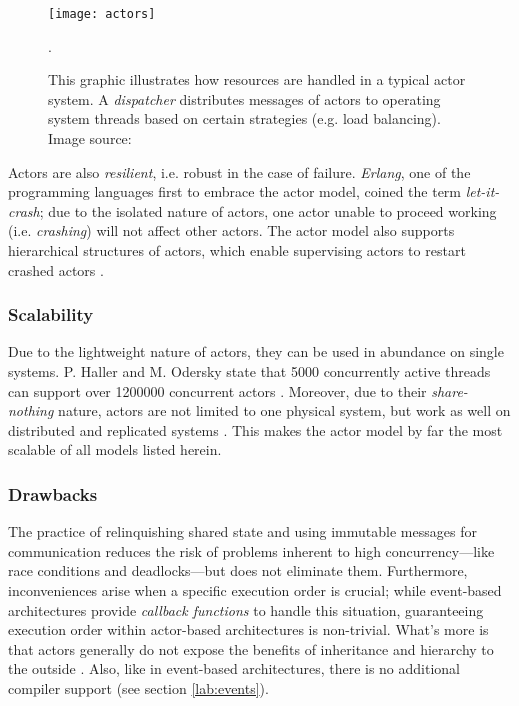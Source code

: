 \begin{figure}
\centering\small
\setlength{\tabcolsep}{0mm}
  \texttt{[image: actors]}
\caption{This graphic illustrates how resources are handled in a typical actor system. A \textit{dispatcher} distributes messages of actors to operating system threads based on certain strategies (e.g. load balancing). Image source: \cite{Gupta2012}}.
\label{fig:actorsfoo}
\end{figure}

Actors are also \textit{resilient}, i.e. robust in the case of failure. \textit{Erlang}, one of the programming languages first to embrace the actor model, coined the term \textit{let-it-crash}; due to the isolated nature of actors, one actor unable to proceed working (i.e. \textit{crashing}) will not affect other actors. The actor model also supports hierarchical structures of actors, which enable supervising actors to restart crashed actors \cite{Armstrong2007}.

\subsubsection*{Scalability}
Due to the lightweight nature of actors, they can be used in abundance on single systems. P. Haller and M. Odersky state that 5000 concurrently active threads can support over 1200000 concurrent actors \cite[p. 2]{Haller2009}. Moreover, due to their \textit{share-nothing} nature, actors are not limited to one physical system, but work as well on distributed and replicated systems \cite[p. 233]{Gupta2012}. This makes the actor model by far the most scalable of all models listed herein. 

\subsubsection*{Drawbacks}
The practice of relinquishing shared state and using immutable messages for communication reduces the risk of problems inherent to high concurrency---like race conditions and deadlocks---but does not eliminate them. Furthermore, inconveniences arise when a specific execution order is crucial; while event-based architectures provide \textit{callback functions} to handle this situation, guaranteeing execution order within actor-based architectures is non-trivial. What's more is that actors generally do not expose the benefits of inheritance and hierarchy to the outside \cite{Mackay97}. Also, like in event-based architectures, there is no additional compiler support (see section \ref{lab:events}).
